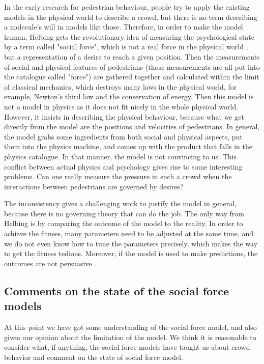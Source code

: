 In the early research for pedestrian behaviour, people try to apply the existing models in the physical world to describe a crowd, but there is no term describing 
a molecule's will in models like those. Therefore, in order to make the model human, Helbing gets the revolutionary idea of measuring the psychological state 
by a term called "social force", which is not a real force in the physical world \cite{social-force}, but a representation of a desire to reach a given position. Then the measurements of social and physical features of pedestrians (those measurements are all put into the catalogue called "force") are gathered together and calculated within the limit of classical mechanics, which destroys many laws in the physical world, for example, Newton's third law and the conservation of energy. Then this model is not a model in physics as it does not fit nicely in the whole physical world. However, it insists in describing the physical behaviour, because what we get directly from the model are the positions and velocities of pedestrians. In general, the model grabs some ingredients from both social and physical aspects, put them into the physics machine, and comes up with the product that falls in the physics catalogue. In that manner, the model is not convincing to us.
This conflict between actual physics and psychology gives rise to some interesting problems. Can one really measure the pressure in such a crowd when the interactions between pedestrians are governed by desires?

The inconsistency gives a challenging work to justify the model in general, because there is no governing theory that can do the job. The only way from Helbing 
is by comparing the outcome of the model to the reality. In order to achieve the fitness, many parameters need to be adjusted at the same time, and we do not even know how to tune the parameters precisely, which makes the way to get the fitness tedious. Moreover, if the model is used to make predictions, the
outcomes are not persuasive . 

\subsection{Comments on the state of the social force models}
At this point we have got some understanding of the social force model, and 
also given our opinion about the limitation of the model. We think it is 
reasonable to consider what, if anything, the social force models have taught 
us about crowd behavior and comment on the state of social force model. 

